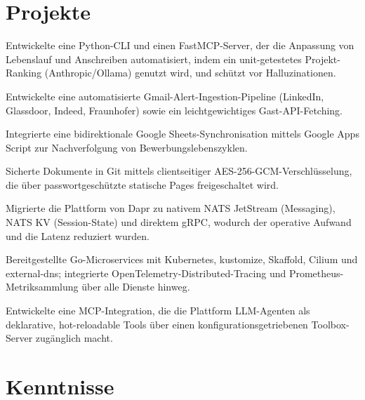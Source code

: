 \documentclass[10pt,a4paper]{resume}
\begin{document}
\section{Projekte}

\bullets
  \item Entwickelte eine Python-CLI und einen FastMCP-Server, der die Anpassung von Lebenslauf und Anschreiben automatisiert, indem ein unit-getestetes Projekt-Ranking (Anthropic/Ollama) genutzt wird, und schützt vor Halluzinationen.
  \item Entwickelte eine automatisierte Gmail-Alert-Ingestion-Pipeline (LinkedIn, Glassdoor, Indeed, Fraunhofer) sowie ein leichtgewichtiges Gast-API-Fetching.
  \item Integrierte eine bidirektionale Google Sheets-Synchronisation mittels Google Apps Script zur Nachverfolgung von Bewerbungslebenszyklen.
  \item Sicherte Dokumente in Git mittels clientseitiger AES-256-GCM-Verschlüsselung, die über passwortgeschützte statische Pages freigeschaltet wird.
\bulletsend
\vspace{1.0pt}
\bullets
  \item Migrierte die Plattform von Dapr zu nativem NATS JetStream (Messaging), NATS KV (Session-State) und direktem gRPC, wodurch der operative Aufwand und die Latenz reduziert wurden.
  \item Bereitgestellte Go-Microservices mit Kubernetes, kustomize, Skaffold, Cilium und external-dns; integrierte OpenTelemetry-Distributed-Tracing und Prometheus-Metriksammlung über alle Dienste hinweg.
  \item Entwickelte eine MCP-Integration, die die Plattform LLM-Agenten als deklarative, hot-reloadable Tools über einen konfigurationsgetriebenen Toolbox-Server zugänglich macht.
\bulletsend

\section{Kenntnisse}
\end{document}
